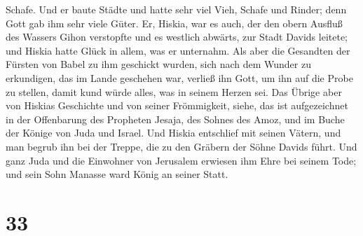 Schafe.  Und er baute Städte und hatte sehr viel Vieh,
Schafe und Rinder; denn Gott gab ihm sehr viele Güter. 
Er, Hiskia, war es auch, der den obern Ausfluß des Wassers Gihon
verstopfte und es westlich abwärts, zur Stadt Davids leitete; und Hiskia
hatte Glück in allem, was er unternahm.  Als aber die
Gesandten der Fürsten von Babel zu ihm geschickt wurden, sich nach dem
Wunder zu erkundigen, das im Lande geschehen war, verließ ihn Gott, um
ihn auf die Probe zu stellen, damit kund würde alles, was in seinem
Herzen sei.  Das Übrige aber von Hiskias Geschichte und
von seiner Frömmigkeit, siehe, das ist aufgezeichnet in der Offenbarung
des Propheten Jesaja, des Sohnes des Amoz, und im Buche der Könige von
Juda und Israel.  Und Hiskia entschlief mit seinen
Vätern, und man begrub ihn bei der Treppe, die zu den Gräbern der Söhne
Davids führt. Und ganz Juda und die Einwohner von Jerusalem erwiesen ihm
Ehre bei seinem Tode; und sein Sohn Manasse ward König an seiner Statt.

\hypertarget{section-32}{%
\section{33}\label{section-32}}

